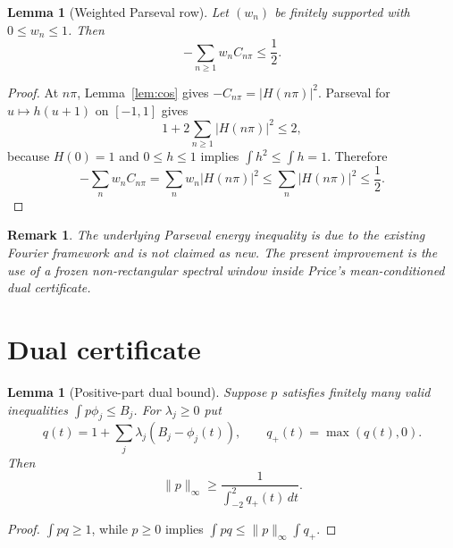 \documentclass[11pt]{amsart}
\newtheorem{lemma}[theorem]{Lemma}
\newtheorem{remark}[theorem]{Remark}
\newcommand{\dd}{\,d}
\begin{document}
\begin{lemma}[Weighted Parseval row]\label{lem:wp}
Let $(w_n)$ be finitely supported with $0\le w_n\le1$.  Then
\[
 -\sum_{n\ge1}w_n C_{n\pi}\le\frac12.
\]
\end{lemma}
\begin{proof}
At $n\pi$, Lemma~\ref{lem:cos} gives
$-C_{n\pi}=|H(n\pi)|^2$.  Parseval for $u\mapsto h(u+1)$ on $[-1,1]$ gives
\[
 1+2\sum_{n\ge1}|H(n\pi)|^2\le2,
\]
because $H(0)=1$ and $0\le h\le1$ implies
$\int h^2\le\int h=1$.  Therefore
\[
 -\sum_nw_nC_{n\pi}
 =\sum_nw_n|H(n\pi)|^2
 \le\sum_n|H(n\pi)|^2\le\frac12.
\]
\end{proof}
\begin{remark}
The underlying Parseval energy inequality is due to the existing Fourier
framework and is not claimed as new.  The present improvement is the use of a
frozen non-rectangular spectral window inside Price's mean-conditioned dual
certificate.
\end{remark}

\section{Dual certificate}
\begin{lemma}[Positive-part dual bound]\label{lem:dual}
Suppose $p$ satisfies finitely many valid inequalities
$\int p\phi_j\le B_j$.  For $\lambda_j\ge0$ put
\[
 q(t)=1+\sum_j\lambda_j(B_j-\phi_j(t)),
 \qquad q_+(t)=\max(q(t),0).
\]
Then
\[
 \|p\|_\infty\ge\frac1{\int_{-2}^{2}q_+(t)\dd t}.
\]
\end{lemma}
\begin{proof}
$\int pq\ge1$, while $p\ge0$ implies
$\int pq\le\|p\|_\infty\int q_+$.
\end{proof}
\end{document}
